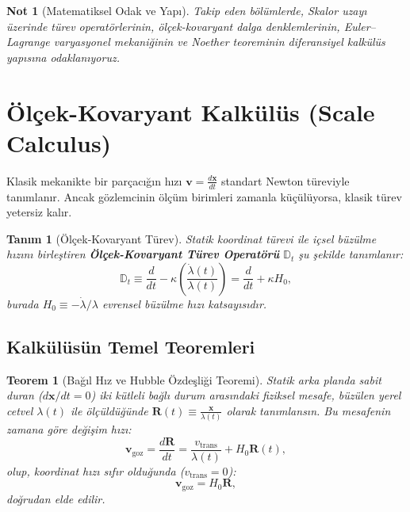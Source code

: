 \documentclass[11pt,a4paper]{article}
\newtheorem{theorem}{Teorem}[section]
\newtheorem{definition}{Tanım}[section]
\newtheorem{remark}{Not}[section]
\begin{document}
\begin{remark}[Matematiksel Odak ve Yapı]
    \label{rem:fiziksel_izdusum}
    Takip eden bölümlerde, Skalor uzayı üzerinde türev operatörlerinin, ölçek-kovaryant dalga denklemlerinin, Euler--Lagrange varyasyonel mekaniğinin ve Noether teoreminin diferansiyel kalkülüs yapısına odaklanıyoruz.
\end{remark}

\section{Ölçek-Kovaryant Kalkülüs (Scale Calculus)}
\label{sec:kalkulus}

Klasik mekanikte bir parçacığın hızı $\mathbf{v} = \frac{d\mathbf{x}}{dt}$ standart Newton türeviyle tanımlanır. Ancak gözlemcinin ölçüm birimleri zamanla küçülüyorsa, klasik türev yetersiz kalır.

\begin{definition}[Ölçek-Kovaryant Türev]
    \label{def:olcek_kovaryant_turev_sc}
    Statik koordinat türevi ile içsel büzülme hızını birleştiren \textbf{Ölçek-Kovaryant Türev Operatörü} $\mathbb{D}_t$ şu şekilde tanımlanır:
    \begin{equation}
        \mathbb{D}_t \equiv \frac{d}{dt} - \kappa \left( \frac{\dot{\lambda}(t)}{\lambda(t)} \right) = \frac{d}{dt} + \kappa H_0,
        \label{eq:olcek_turev_operatoru}
    \end{equation}
    burada $H_0 \equiv -\dot{\lambda}/\lambda$ evrensel büzülme hızı katsayısıdır.
\end{definition}

\subsection{Kalkülüsün Temel Teoremleri}

\begin{theorem}[Bağıl Hız ve Hubble Özdeşliği Teoremi]
    \label{thm:hubble_teoremi}
    Statik arka planda sabit duran ($d\mathbf{x}/dt = 0$) iki kütleli bağlı durum arasındaki fiziksel mesafe, büzülen yerel cetvel $\lambda(t)$ ile ölçüldüğünde $\mathbf{R}(t) \equiv \frac{\mathbf{x}}{\lambda(t)}$ olarak tanımlansın. Bu mesafenin zamana göre değişim hızı:
    \begin{equation}
        \mathbf{v}_{\mathrm{goz}} = \frac{d\mathbf{R}}{dt} = \frac{v_{\mathrm{trans}}}{\lambda(t)} + H_0 \mathbf{R}(t),
        \label{eq:hubble_ispat}
    \end{equation}
    olup, koordinat hızı sıfır olduğunda ($v_{\mathrm{trans}} = 0$):
    \begin{equation}
        \mathbf{v}_{\mathrm{goz}} = H_0 \mathbf{R},
        \label{eq:hubble_saf}
    \end{equation}
    doğrudan elde edilir.
\end{theorem}
\end{document}
